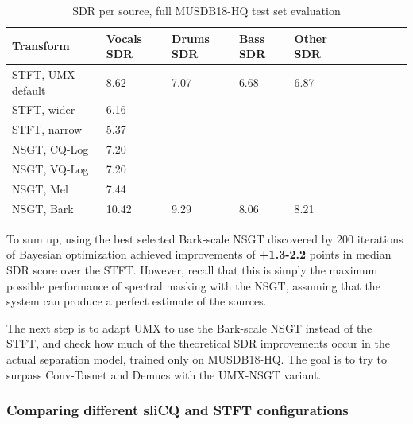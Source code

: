 \documentclass[report.tex]{subfiles}
\begin{document}
\begin{table}[ht]
	\centering
\begin{tabular}{ |l|l|l|l|l|c|c|c|c|c| }
	 \hline
	  Transform & Vocals SDR & Drums SDR & Bass SDR & Other SDR \\
	 \hline
	 \hline
	 STFT, UMX default & 8.62 & 7.07 & 6.68 & 6.87 \\
	 \hline
	 STFT, wider & 6.16 \\
	 \hline
	 STFT, narrow & 5.37 \\
	 \hline
	 NSGT, CQ-Log & 7.20 \\
	 \hline
	 NSGT, VQ-Log & 7.20 \\
	 \hline
	 NSGT, Mel & 7.44 \\
	 \hline
	 NSGT, Bark & 10.42 & 9.29 & 8.06 & 8.21 \\
	 \hline
\end{tabular}
	\caption{SDR per source, full MUSDB18-HQ test set evaluation}
	\label{table:nsgtbayesresults2}
\end{table}

To sum up, using the best selected Bark-scale NSGT discovered by 200 iterations of Bayesian optimization achieved improvements of \textbf{+1.3-2.2}  points in median SDR score over the STFT. However, recall that this is simply the maximum possible performance of spectral masking with the NSGT, assuming that the system can produce a perfect estimate of the sources.

The next step is to adapt UMX to use the Bark-scale NSGT instead of the STFT, and check how much of the theoretical SDR improvements occur in the actual separation model, trained only on MUSDB18-HQ. The goal is to try to surpass Conv-Tasnet and Demucs with the UMX-NSGT variant.

\subsubsection{Comparing different sliCQ and STFT configurations}


\end{document}
